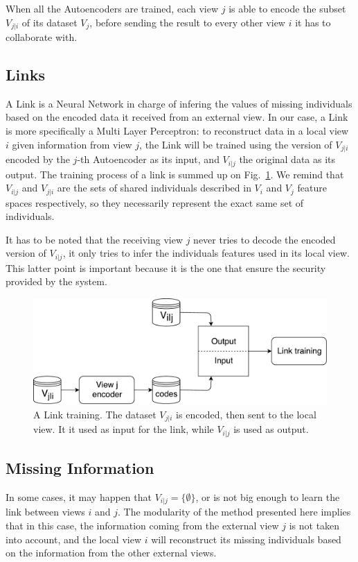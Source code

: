 When all the Autoencoders are trained, each view $j$ is able to encode the subset $V_{j|i}$ of its dataset $V_j$, before sending the result to every other view $i$ it has to collaborate with.
		
		\subsection{Links}
\label{sec:links}
A Link is a Neural Network in charge of infering the values of missing individuals based on the encoded data it received from an external view. In our case, a Link is more specifically a Multi Layer Perceptron: to reconstruct data in a local view $i$ given information from view $j$, the Link will be trained using the version of $V_{j|i}$ encoded by the $j$-th Autoencoder as its input, and $V_{i|j}$ the original data as its output. The training process of a link is summed up on Fig.~\ref{fig:link}. We remind that $V_{i|j}$ and $V_{j|i}$ are the sets of shared individuals described in $V_i$ and $V_j$ feature spaces respectively, so they necessarily represent the exact same set of individuals.

It has to be noted that the receiving view $j$ never tries to decode the encoded version of $V_{i|j}$, it only tries to infer the individuals features used in its local view. This latter point is important because it is the one that ensure the security provided by the system.

		\begin{figure}[h]
			\centering
			\includegraphics[scale=0.4]{img/links.pdf}
            \caption{A Link training. The dataset $V_{j|i}$ is encoded, then sent to the local view. It it used as input for the link, while $V_{i|j}$ is used as output.}
\label{fig:link}
		\end{figure}
		
        \subsection{Missing Information}
In some cases, it may happen that $V_{i|j} = \{\emptyset\}$, or is not big enough to learn the link between views $i$ and $j$. The modularity of the method presented here implies that in this case, the information coming from the external view $j$ is not taken into account, and the local view $i$ will reconstruct its missing individuals based on the information from the other external views.
		
